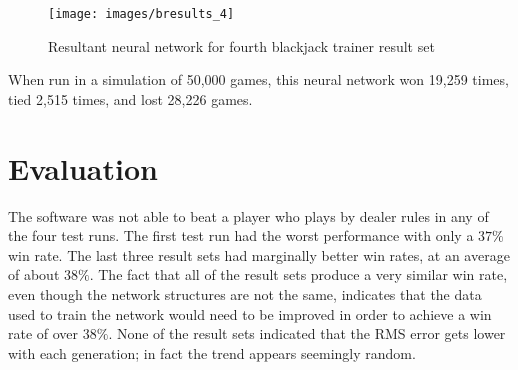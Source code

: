 \begin{figure}[h!]
  \centering
  \texttt{[image: images/bresults\_4]}
  \caption{Resultant neural network for fourth blackjack trainer result set}
  \label{bresults_4}
\end{figure}

When run in a simulation of 50,000 games, this neural network won 19,259
times, tied 2,515 times, and lost 28,226 games.

\section{Evaluation}
The software was not able to beat a player who plays by dealer rules
in any of the four test runs.
The first test run had the worst performance with only a $37\%$ win
rate. 
The last three result sets had marginally better win rates, at an
average of about $38\%$.
The fact that all of the result sets produce a very similar win rate,
even though the network structures are not the same, indicates that
the data used to train the network would need to be improved in order
to achieve a win rate of over $38\%$.
None of the result sets indicated that the RMS error gets lower with
each generation; in fact the trend appears seemingly random.

